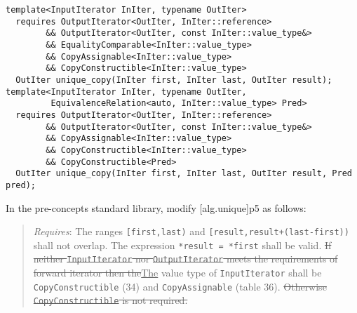 \documentclass[american]{article}
\newcommand{\added}[1]{\textcolor{addclr}{\ul{#1}}}
\newcommand{\removed}[1]{\textcolor{remclr}{\st{#1}}}
\newcommand{\changed}[2]{\removed{#1}\added{#2}}
\newcommand{\code}[1]{\lstinline[basicstyle=\sffamily,keywords={}]{#1}}
\newcommand{\tcode}[1]{\code{#1}}
\begin{document}
\begin{lstlisting}
template<InputIterator InIter, typename OutIter>
  requires OutputIterator<OutIter, InIter::reference>
        && OutputIterator<OutIter, const InIter::value_type&>
        && EqualityComparable<InIter::value_type> 
        && CopyAssignable<InIter::value_type>
        && CopyConstructible<InIter::value_type> 
  OutIter unique_copy(InIter first, InIter last, OutIter result);
template<InputIterator InIter, typename OutIter,
         EquivalenceRelation<auto, InIter::value_type> Pred>
  requires OutputIterator<OutIter, InIter::reference>
        && OutputIterator<OutIter, const InIter::value_type&>
        && CopyAssignable<InIter::value_type> 
        && CopyConstructible<InIter::value_type> 
        && CopyConstructible<Pred>
  OutIter unique_copy(InIter first, InIter last, OutIter result, Pred pred);
\end{lstlisting}

\noindent
In the pre-concepts standard library, modify [alg.unique]p5 as
follows:

\begin{quote}
\textit{Requires}: The ranges \tcode{[first,last)} and \tcode{[result,result+(last-first))} shall not overlap. The expression 
\tcode{*result = *first} shall be valid. \changed{If neither \mbox{\tcode{InputIterator}} nor \mbox{\tcode{OutputIterator}} meets the requirements 
of forward iterator then the}{The} value type of \tcode{InputIterator} shall be \tcode{CopyConstructible} (34) and \tcode{CopyAssignable}
(table 36). \removed{Otherwise \mbox{\tcode{CopyConstructible}} is not required.}
\end{quote}
\end{document}
